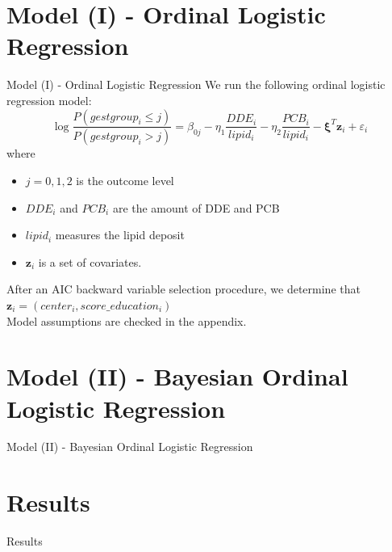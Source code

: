 \documentclass{beamer}\usepackage[]{graphicx}\usepackage[]{color}
\begin{document}

\section{Model (I) - Ordinal Logistic Regression}
\begin{frame}{Model (I) - Ordinal Logistic Regression}
We run the following ordinal logistic regression model:
$$\log \frac{P(gestgroup_i \leq j)}{P(gestgroup_i > j)} = \beta_{0j} - \eta_1\frac{DDE_i}{lipid_i} - \eta_2\frac{PCB_i}{lipid_i} - \boldsymbol{\xi}^T\mathbf{z}_i + \varepsilon_i$$
where 
\begin{itemize}
\item $j = 0,1,2$ is the outcome level
\item $DDE_i$ and $PCB_i$ are the amount of DDE and PCB
\item $lipid_i$ measures the lipid deposit 
\item $\mathbf{z}_i$ is a set of covariates. 
\end{itemize}
After an AIC backward variable selection procedure, we determine that $\mathbf{z}_i = (center_i, score\_education_i)$\\
Model assumptions are checked in the appendix.
\end{frame}
\section{Model (II) - Bayesian Ordinal Logistic Regression}
\begin{frame}{Model (II) - Bayesian Ordinal Logistic Regression}
\end{frame}

\section{Results}
\begin{frame}{Results}
\end{frame}


\end{document}

